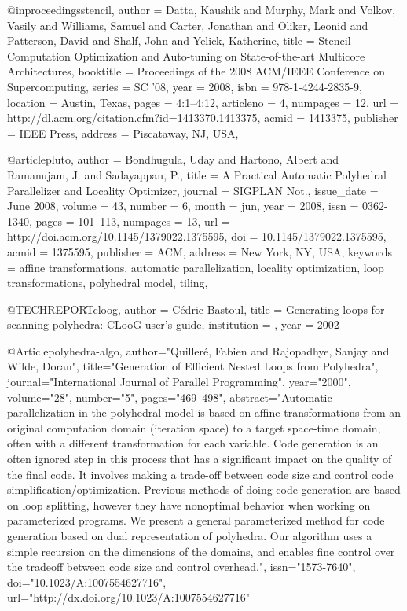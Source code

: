 @inproceedings{stencil,
 author = {Datta, Kaushik and Murphy, Mark and Volkov, Vasily and Williams, Samuel and Carter, Jonathan and Oliker, Leonid and Patterson, David and Shalf, John and Yelick, Katherine},
 title = {Stencil Computation Optimization and Auto-tuning on State-of-the-art Multicore Architectures},
 booktitle = {Proceedings of the 2008 ACM/IEEE Conference on Supercomputing},
 series = {SC '08},
 year = {2008},
 isbn = {978-1-4244-2835-9},
 location = {Austin, Texas},
 pages = {4:1--4:12},
 articleno = {4},
 numpages = {12},
 url = {http://dl.acm.org/citation.cfm?id=1413370.1413375},
 acmid = {1413375},
 publisher = {IEEE Press},
 address = {Piscataway, NJ, USA},
} 



@article{pluto,
 author = {Bondhugula, Uday and Hartono, Albert and Ramanujam, J. and Sadayappan, P.},
 title = {A Practical Automatic Polyhedral Parallelizer and Locality Optimizer},
 journal = {SIGPLAN Not.},
 issue_date = {June 2008},
 volume = {43},
 number = {6},
 month = jun,
 year = {2008},
 issn = {0362-1340},
 pages = {101--113},
 numpages = {13},
 url = {http://doi.acm.org/10.1145/1379022.1375595},
 doi = {10.1145/1379022.1375595},
 acmid = {1375595},
 publisher = {ACM},
 address = {New York, NY, USA},
 keywords = {affine transformations, automatic parallelization, locality optimization, loop transformations, polyhedral model, tiling},
} 

@TECHREPORT{cloog,
    author = {Cédric Bastoul},
    title = {Generating loops for scanning polyhedra: CLooG user’s guide},
    institution = {},
    year = {2002}
}


@Article{polyhedra-algo,
author="Quiller{\'e}, Fabien
and Rajopadhye, Sanjay
and Wilde, Doran",
title="Generation of Efficient Nested Loops from Polyhedra",
journal="International Journal of Parallel Programming",
year="2000",
volume="28",
number="5",
pages="469--498",
abstract="Automatic parallelization in the polyhedral model is based on affine transformations from an original computation domain (iteration space) to a target space-time domain, often with a different transformation for each variable. Code generation is an often ignored step in this process that has a significant impact on the quality of the final code. It involves making a trade-off between code size and control code simplification/optimization. Previous methods of doing code generation are based on loop splitting, however they have nonoptimal behavior when working on parameterized programs. We present a general parameterized method for code generation based on dual representation of polyhedra. Our algorithm uses a simple recursion on the dimensions of the domains, and enables fine control over the tradeoff between code size and control overhead.",
issn="1573-7640",
doi="10.1023/A:1007554627716",
url="http://dx.doi.org/10.1023/A:1007554627716"
}


